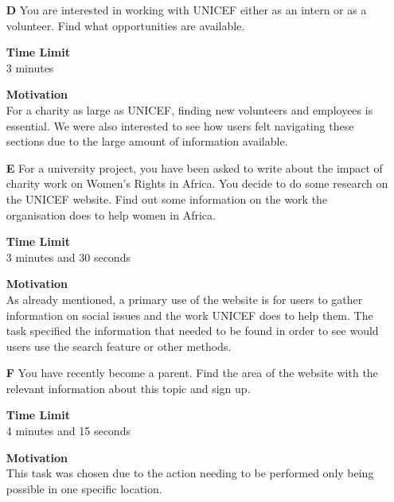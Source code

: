 \begin{itemize}
    \item [\textbf{D}] You are interested in working with UNICEF either as an intern or as a volunteer. 
    Find what opportunities are available.

    \item [] \textbf{Time Limit}\\
    3 minutes

    \item [] \textbf{Motivation}\\
    For a charity as large as UNICEF, finding new volunteers and employees is essential.
    We were also interested to see how users felt navigating these sections due to the large amount of information available.

    \item [\textbf{E}] For a university project, you have been asked to write about the impact of charity work on Women’s Rights in Africa. 
    You decide to do some research on the UNICEF website.
    Find out some information on the work the organisation does to help women in Africa. 

    \item [] \textbf{Time Limit}\\
    3 minutes and 30 seconds

    \item [] \textbf{Motivation}\\
    As already mentioned, a primary use of the website is for users to gather information on social issues and the work UNICEF does to help them.
    The task specified the information that needed to be found in order to see would users use the search feature or other methods.
    
    \newpage
    \item [\textbf{F}] You have recently become a parent. 
    Find the area of the website with the relevant information about this topic and sign up.

    \item [] \textbf{Time Limit}\\
    4 minutes and 15 seconds

    \item [] \textbf{Motivation}\\
    This task was chosen due to the action needing to be performed only being possible in one specific location.
    
\end{itemize}

